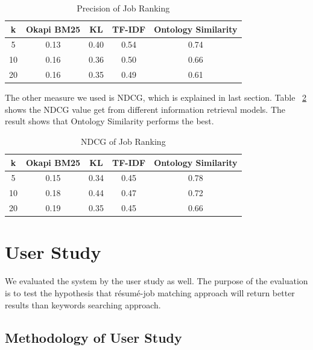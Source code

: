 \begin{table}[ht]
\caption{Precision of Job Ranking } %
\centering %
\begin{tabular}{    | c | c | c | c | c |  }
 \hline
       k     & Okapi BM25 & KL    & TF-IDF   & Ontology Similarity  \\
 \hline
       5     & 0.13       & 0.40  & 0.54     & 0.74   \\
 \hline
       10    & 0.16       & 0.36  & 0.50     & 0.66   \\
 \hline
       20    & 0.16       & 0.35  & 0.49     & 0.61   \\
 \hline

\end{tabular}
\label{tab:job_precision} %
\end{table}

The other measure we used is NDCG, which is explained in last section. Table ~\ref{tab:job_ndcg} shows the NDCG value get from different information retrieval models. The result shows that Ontology Similarity  performs the best.

\begin{table}[ht]
\caption{NDCG of Job Ranking } %
\centering %
\begin{tabular}{    | c | c | c | c | c |  }
 \hline
       k    & Okapi BM25 & KL    & TF-IDF & Ontology Similarity  \\
 \hline
       5    & 0.15       & 0.34  & 0.45     & 0.78   \\
 \hline
       10   & 0.18       & 0.44  & 0.47     & 0.72   \\
 \hline
       20   & 0.19       & 0.35  & 0.45     & 0.66   \\
 \hline

\end{tabular}
\label{tab:job_ndcg} %
\end{table}

\section{User Study}

We evaluated the system by the user study as well. The purpose of the evaluation is to test the hypothesis that r\'esum\'e-job matching approach will return better results than keywords searching approach.

\subsection{Methodology of User Study}

